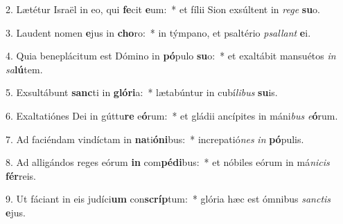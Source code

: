 2. Lætétur Israël in eo, qui \textbf{fe}cit \textbf{e}um:~*  et fílii Sion exsúltent in \textit{re}\textit{ge} \textbf{su}o.\

3. Laudent nomen \textbf{e}jus in \textbf{cho}ro:~*  in týmpano, et psaltério \textit{psal}\textit{lant} \textbf{e}i.\

4. Quia beneplácitum est Dómino in \textbf{pó}pulo \textbf{su}o:~*  et exaltábit mansuétos \textit{in} \textit{sa}\textbf{lú}tem.\

5. Exsultábunt \textbf{sanc}ti in \textbf{gló}\textbf{ri}a:~*  lætabúntur in cubí\textit{li}\textit{bus} \textbf{su}is.\

6. Exaltatiónes Dei in gúttu\textbf{re} e\textbf{ó}rum:~*  et gládii ancípites in máni\textit{bus} \textit{e}\textbf{ó}rum.\

7. Ad faciéndam vindíctam in \textbf{na}ti\textbf{ó}\textbf{ni}bus:~*  increpatió\textit{nes} \textit{in} \textbf{pó}pulis.\

8. Ad alligándos reges eórum \textbf{in} com\textbf{pé}\textbf{di}bus:~*  et nóbiles eórum in má\textit{ni}\textit{cis} \textbf{fér}reis.\

9. Ut fáciant in eis judíci\textbf{um} con\textbf{scríp}tum:~*  glória hæc est ómnibus \textit{sanc}\textit{tis} \textbf{e}jus.\

